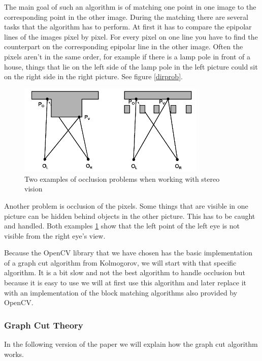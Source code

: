 \documentclass[a4paper]{article}
\begin{document}
The main goal of such an algorithm is of
matching one point in one image to the corresponding point in the
other image. During the matching there are several tasks that the
algorithm has to perform. At first it has to compare the epipolar
lines of the images pixel by pixel. For every pixel on one line you
have to find the counterpart on the corresponding epipolar line in the
other image. Often the pixels aren't in the same order, for example if
there is a lamp pole in front of a house, things that lie on the left
side of the lamp pole in the left picture could sit on the right side
in the right picture. See figure \ref{dirprob}.

\begin{figure} [h!tb]
\centering
\includegraphics[width=0.8\textwidth]{matching_problems_occlusion}
\caption{Two examples of occlusion problems when working with stereo
vision}
\label{occprob} 
\end{figure}

Another problem is occlusion of the pixels. Some things that are
visible in one picture can be hidden behind objects in the other
picture. This has to be caught and handled. Both examples \ref{occprob}
show that the left point of the left eye is not visible from the right
eye's view.

Because the OpenCV library that we have chosen has the basic
implementation of a graph cut algorithm from
Kolmogorov\cite{kolmogorov2003}, we will start with that specific
algorithm. It is a bit slow and not the best algorithm to handle
occlusion but because it is easy to use we will at first use this
algorithm and later replace it with an implementation of the block
matching algorithms also provided by OpenCV. 

\subsubsection{Graph Cut Theory}
\label{gc_theory}
In the following version of the paper we will explain how the graph
cut algorithm works.
\end{document}

